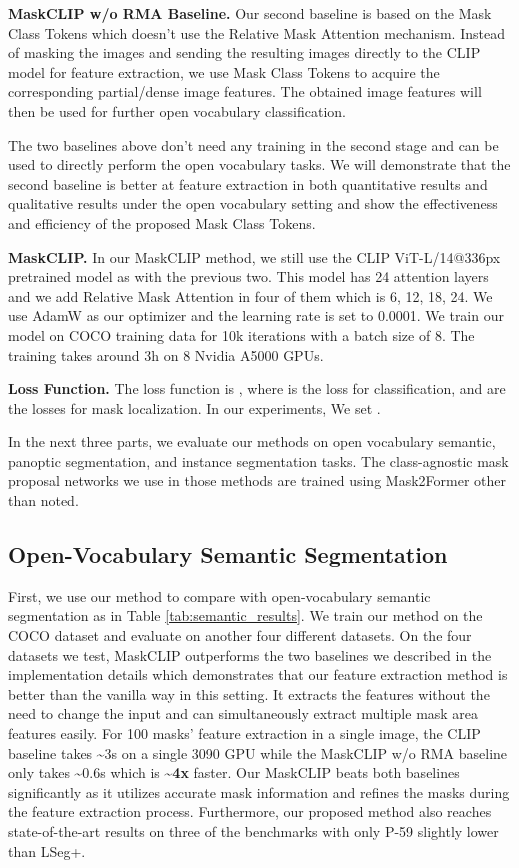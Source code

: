 \documentclass{article}
\theoremstyle{plain}
\theoremstyle{definition}
\theoremstyle{remark}
\begin{document}
\textbf{MaskCLIP w/o RMA Baseline.} Our second baseline is based on the Mask Class Tokens which doesn't use the Relative Mask Attention mechanism. Instead of masking the images and sending the resulting images directly to the CLIP model for feature extraction, we use Mask Class Tokens to acquire the corresponding partial/dense image features. The obtained image features will then be used for further open vocabulary classification.

The two baselines above don't need any training in the second stage and can be used to directly perform the open vocabulary tasks. We will demonstrate that the second baseline is better at feature extraction in both quantitative results and qualitative results under the open vocabulary setting and show the effectiveness and efficiency of the proposed Mask Class Tokens.

\textbf{MaskCLIP.} In our MaskCLIP method, we still use the CLIP ViT-L/14@336px pretrained model as with the previous two. This model has 24 attention layers and we add Relative Mask Attention in four of them which is 6, 12, 18, 24. We use AdamW \citep{loshchilov2017decoupled} as our optimizer and the learning rate is set to 0.0001. We train our model on COCO training data for 10k iterations with a batch size of 8. The training takes around 3h on 8 Nvidia A5000 GPUs.

{
\textbf{Loss Function.} The loss function is , where  is the loss for classification,  and   are the losses for mask localization. In our experiments, We set . 
}

In the next three parts, we evaluate our methods on open vocabulary semantic, panoptic segmentation, and instance segmentation tasks. The class-agnostic mask proposal networks we use in those methods are trained using Mask2Former other than noted.

\subsection{Open-Vocabulary Semantic Segmentation}


First, we use our method to compare with open-vocabulary semantic segmentation as in Table \ref{tab:semantic_results}. We train our method on the COCO dataset and evaluate on another four different datasets. On the four datasets we test, MaskCLIP outperforms the two baselines we described in the implementation details which demonstrates that our feature extraction method is better than the vanilla way in this setting. It extracts the features without the need to change the input and can simultaneously extract multiple mask area features easily. For 100 masks' feature extraction in a single image, the CLIP baseline takes \textasciitilde 3s on a single 3090 GPU while the MaskCLIP w/o RMA baseline only takes \textasciitilde 0.6s which is \textbf{\textasciitilde 4x} faster. Our MaskCLIP beats both baselines significantly as it utilizes accurate mask information and refines the masks during the feature extraction process. Furthermore, our proposed method also reaches state-of-the-art results on three of the benchmarks with only P-59 slightly lower than LSeg+\cite{li2022language}.
\end{document}

